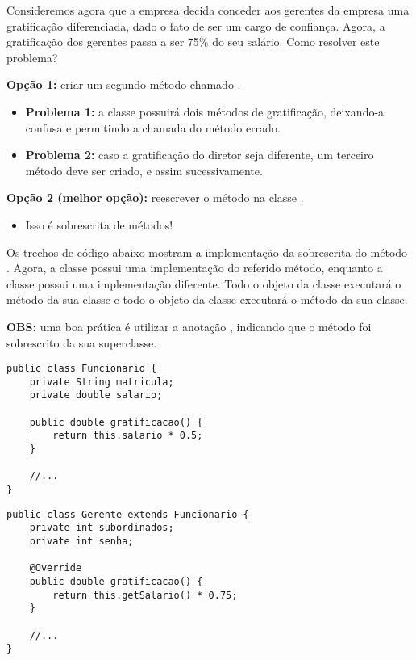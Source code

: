  
Consideremos agora que a empresa decida conceder aos gerentes da empresa uma gratificação diferenciada, dado o fato de ser um cargo de confiança. Agora, a gratificação dos gerentes passa a ser 75\% do seu salário. Como resolver este problema?

\textbf{Opção 1:} criar um segundo método chamado .
\begin{itemize}
	\item \textbf{Problema 1:} a classe  possuirá dois métodos de gratificação, deixando-a confusa e permitindo a chamada do método errado.
	\item \textbf{Problema 2:} caso a gratificação do diretor seja diferente, um terceiro método deve ser criado, e assim sucessivamente.
\end{itemize}

\textbf{Opção 2 (melhor opção):} reescrever o método  na classe .
\begin{itemize}
	\item Isso é sobrescrita de métodos!
\end{itemize}

Os trechos de código abaixo mostram a implementação da sobrescrita do método . Agora, a classe  possui uma implementação do referido método, enquanto a classe  possui uma implementação diferente. Todo o objeto da classe  executará o método  da sua classe e todo o objeto da classe  executará o método  da sua classe.

\textbf{OBS: } uma boa prática é utilizar a anotação , indicando que o método foi sobrescrito da sua superclasse.

\begin{verbatim}
public class Funcionario {
	private String matricula;
	private double salario;
	
	public double gratificacao() {
		return this.salario * 0.5;
	}
	
	//...
}
\end{verbatim}
 
\begin{verbatim}
public class Gerente extends Funcionario {
	private int subordinados;
	private int senha;

	@Override
	public double gratificacao() {
		return this.getSalario() * 0.75;
	}

	//...
}
\end{verbatim}
 
